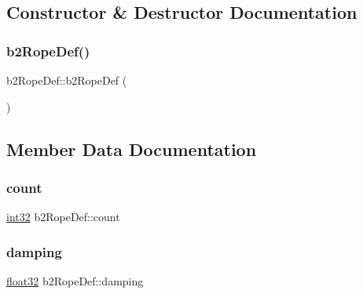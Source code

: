 \subsection{Constructor \& Destructor Documentation}
\mbox{\label{structb2_rope_def_a180ccb1c45c5e979e08ce6d0484638fd}} 
\subsubsection{\texorpdfstring{b2RopeDef()}{b2RopeDef()}}
{\footnotesize\ttfamily b2\+Rope\+Def\+::b2\+Rope\+Def (\begin{DoxyParamCaption}{ }\end{DoxyParamCaption})\hspace{0.3cm}{\ttfamily [inline]}}



\subsection{Member Data Documentation}
\mbox{\label{structb2_rope_def_a0c75d4289a807e31f32dc43a2276671f}} 
\subsubsection{\texorpdfstring{count}{count}}
{\footnotesize\ttfamily \mbox{\hyperlink{b2_settings_8h_a43d43196463bde49cb067f5c20ab8481}{int32}} b2\+Rope\+Def\+::count}

\mbox{\label{structb2_rope_def_a13ad872bb9d4926f3e4e49b7061613cb}} 
\subsubsection{\texorpdfstring{damping}{damping}}
{\footnotesize\ttfamily \mbox{\hyperlink{b2_settings_8h_aacdc525d6f7bddb3ae95d5c311bd06a1}{float32}} b2\+Rope\+Def\+::damping}

\mbox{\label{structb2_rope_def_a90d98969150047662ce835ec1670fb32}} 
